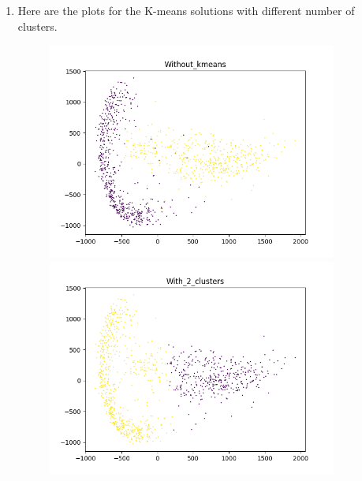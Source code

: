 \documentclass[11pt]{article}
\begin{document}
\begin{enumerate}
\begin{enumerate}
\item Here are the plots for the K-means solutions with different number of clusters.
\begin{figure}[h!]
    \centering
    \begin{minipage}{0.45\textwidth}
    	\centering
        \includegraphics[width=0.9\textwidth]{Without_kmeans}
    \end{minipage}\hfill
    \begin{minipage}{0.45\textwidth}
    	\centering
         \includegraphics[width=0.9\textwidth]{With_2_clusters}
    \end{minipage}\hfill
    \begin{minipage}{0.45\textwidth}
    	\centering

\end{minipage}
\end{figure}
\end{enumerate}
\end{enumerate}
\end{document}
